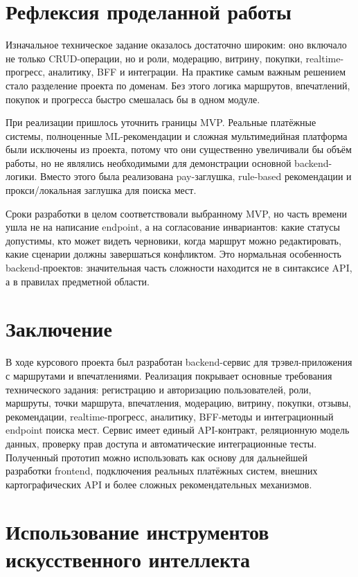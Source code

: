 \documentclass[a4paper,12pt]{extarticle}
\begin{document}
\clearpage

\section{Рефлексия проделанной работы}

Изначальное техническое задание оказалось достаточно широким: оно включало не только CRUD-операции, но и роли, модерацию, витрину, покупки, realtime-прогресс, аналитику, BFF и интеграции. На практике самым важным решением стало разделение проекта по доменам. Без этого логика маршрутов, впечатлений, покупок и прогресса быстро смешалась бы в одном модуле.

При реализации пришлось уточнить границы MVP. Реальные платёжные системы, полноценные ML-рекомендации и сложная мультимедийная платформа были исключены из проекта, потому что они существенно увеличивали бы объём работы, но не являлись необходимыми для демонстрации основной backend-логики. Вместо этого была реализована pay-заглушка, rule-based рекомендации и прокси/локальная заглушка для поиска мест.

Сроки разработки в целом соответствовали выбранному MVP, но часть времени ушла не на написание endpoint, а на согласование инвариантов: какие статусы допустимы, кто может видеть черновики, когда маршрут можно редактировать, какие сценарии должны завершаться конфликтом. Это нормальная особенность backend-проектов: значительная часть сложности находится не в синтаксисе API, а в правилах предметной области.

\section{Заключение}

В ходе курсового проекта был разработан backend-сервис для трэвел-приложения с маршрутами и впечатлениями. Реализация покрывает основные требования технического задания: регистрацию и авторизацию пользователей, роли, маршруты, точки маршрута, впечатления, модерацию, витрину, покупки, отзывы, рекомендации, realtime-прогресс, аналитику, BFF-методы и интеграционный endpoint поиска мест. Сервис имеет единый API-контракт, реляционную модель данных, проверку прав доступа и автоматические интеграционные тесты. Полученный прототип можно использовать как основу для дальнейшей разработки frontend, подключения реальных платёжных систем, внешних картографических API и более сложных рекомендательных механизмов.

\section{Использование инструментов искусственного интеллекта}
\end{document}
